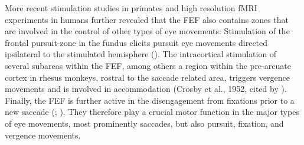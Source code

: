 \documentclass[a4paper, 12pt]{scrreprt}
\begin{document}
More recent stimulation studies in primates and high resolution fMRI experiments in humans further revealed that the FEF also contains zones that are involved in the control of other types of eye movements: Stimulation of the frontal pursuit-zone in the fundus elicits pursuit eye movements directed ipsilateral to the stimulated hemisphere (\cite{blanke2003direction}). The intracortical stimulation of several subareas within the FEF, among others a region within the pre-arcuate cortex in rhesus monkeys, rostral to the saccade related area, triggers vergence movements and is involved in accommodation (Crosby et al., 1952, cited by \textcite{vernet2014corrigendum}). Finally, the FEF is further active in the disengagement from fixations prior to a new saccade (\cite{goodwin2007cranial}; \cite{tehovnik2000eye}). They therefore play a crucial motor function in the major types of eye movements, most prominently saccades, but also pursuit, fixation, and vergence movements. \newline
\end{document}
